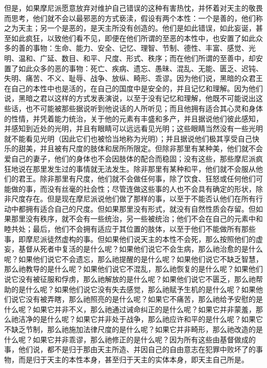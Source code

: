 但是，如果摩尼派愿意放弃对维护自己错误的这种有害热忱，并怀着对天主的敬畏而思考，他们就不会以最邪恶的方式亵渎，假设有两个本性：一个是善的，他们称之为天主；另一个是恶的，是天主所没有创造的。他们是如此错误，如此妄诞，甚至如此疯狂，以致他们看不见，即便在他们所谓的至恶的本性中，也安置了如此众多的善的事物：生命、能力、安全、记忆、理智、节制、德性、丰富、感觉、光明、温和、广延、数目、和平、尺度、形式、秩序；而在他们所谓的至善中，却安置了如此众多的恶的事物：死亡、疾病、遗忘、愚昧、混乱、无能、匮乏、迟钝、失明、痛苦、不义、耻辱、战争、放纵、畸形、乖谬。因为他们说，黑暗的众君王在自己的本性中也是活的，在自己的国度中是安全的，并且记忆和理解。因为他们说，黑暗之君以这样的方式发表演说，以至于没有记忆和理解，他既不可能说出这些话，也不可能被那些据说听到他说话的人所听见；而且他拥有适合其心灵和身体的性情，并凭着能力统治，关于他的元素有丰盛和多产，并且据说他们彼此感知，并感知到近处的光明，并且有眼睛可以远远看见光明；这些眼睛当然没有一些光明就不能看见光明（因此它们也被恰当地称为光明）；并且据说他们极其享受自己快乐的甜美，并且被有尺度的肢体和居所所限定。但除非那里有某种美，他们就不会爱自己的妻子，他们的身体也不会因肢体的配合而稳固；没有这些，那些摩尼派疯狂地说在那里发生过的事情就无法发生。除非那里有某种和平，他们就不会服从他们的君王。除非那里有尺度，他们就不会做任何事，除了饮食、狂怒或任何他们可能做的事，而没有丝毫的社会性；尽管连做这些事的人也不会具有确定的形状，除非尺度存在。但是现在摩尼派说他们做了那样的事，以至于不能否认他们在所有行动中都拥有适合自己的尺度。但如果那里没有形式，就没有自然性质会存留。但如果那里没有秩序，就不会有一些统治，另一些被统治；他们不会在自己的元素中和睦共处；最后，他们不会拥有适应于其位置的肢体，以至于他们不能做所有那些事，即摩尼派徒然虚构的事。但如果他们说天主的本性不会死，那么按照他们的虚妄，基督从死者中复活的是什么呢？如果他们说它不会生病，那么祂治愈的是什么呢？如果他们说它不会遗忘，那么祂提醒的是什么呢？如果他们说它不缺乏智慧，那么祂教导的是什么呢？如果他们说它不混乱，那么祂恢复的是什么呢？如果他们说它没有被征服和俘虏，那么祂解放的是什么呢？如果他们说它不匮乏，那么祂帮助的是什么呢？如果他们说它没有失去感觉，那么祂赋予生机的是什么呢？如果他们说它没有被弄瞎，那么祂照亮的是什么呢？如果它不痛苦，那么祂给予安慰的是什么呢？如果它并非不义，那么祂通过诫命纠正的是什么呢？如果它并非蒙羞，那么祂洁净的是什么呢？如果它并非处于战争，那么祂应许和平的是什么呢？如果它不缺乏节制，那么祂施加法律尺度的是什么呢？如果它并非畸形，那么祂改造的是什么呢？如果它并非乖谬，那么祂修正的是什么呢？因为所有这些由基督做成的事，他们说，都不是归于那由天主所造、并因自己的自由意志在犯罪中败坏了的事物，而是归于天主的本性本身，甚至归于天主的实体本身，即天主自己所是。\par

